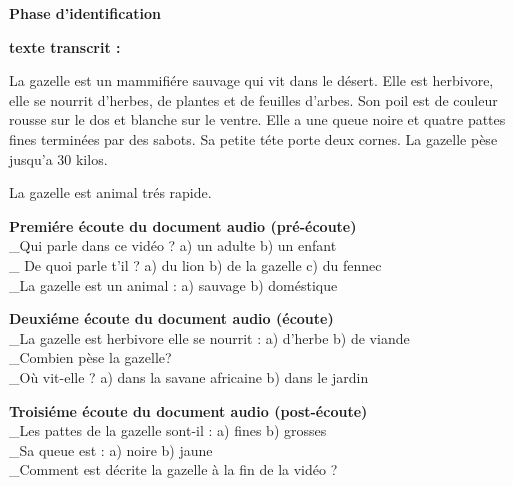 \documentclass[a4paper,11pt]{article}
\begin{document}
\vspace{-2pt}
\begin{center}
\textbf{Phase d'identification}
\end{center}
\vspace{-4pt}
\noindent\textbf{texte transcrit :}\\
\vspace{-2pt}
\begin{tcolorbox}[colback=white,colframe=black,arc=0mm,boxrule=0.8pt,top=4pt,bottom=4pt,left=6pt,right=6pt]
La gazelle est un mammifiére sauvage qui vit dans le désert. Elle est herbivore, elle se nourrit
d'herbes, de plantes et de feuilles d'arbes. Son poil est de couleur rousse sur le dos et blanche sur le ventre.
Elle a une queue noire et quatre pattes fines terminées par des sabots.
Sa petite téte porte deux cornes. La gazelle pèse jusqu'a 30 kilos.
\begin{center}
La gazelle est animal trés rapide.
\end{center}
\end{tcolorbox}

\vspace{-2pt}
\noindent\textbf{Premiére écoute du document audio (pré-écoute)}\\
\_Qui parle dans ce vidéo ? \hfill a) un adulte \hfill b) un enfant \hspace{3cm}\null\\
\_ De quoi parle t'il ? \hfill a) du lion \hfill b) de la gazelle \hfill c) du fennec \hspace{1cm}\null\\
\_La gazelle est un animal : \hfill a) sauvage \hfill b) doméstique \hspace{3cm}\null

\vspace{2pt}
\noindent\textbf{Deuxiéme écoute du document audio (écoute)}\\
\_La gazelle est herbivore elle se nourrit : \hfill a) d'herbe \hfill b) de viande \hspace{3cm}\null\\
\_Combien pèse la gazelle?\\
\_Où vit-elle ? \hfill a) dans la savane africaine \hfill b) dans le jardin \hspace{2.5cm}\null

\vspace{2pt}
\noindent\textbf{Troisiéme écoute du document audio (post-écoute)}\\
\_Les pattes de la gazelle sont-il : \hfill a) fines \hfill b) grosses \hspace{3cm}\null\\
\_Sa queue est : \hfill a) noire \hfill b) jaune \hspace{3.5cm}\null\\
\_Comment est décrite la gazelle à la fin de la vidéo ?
\end{document}
